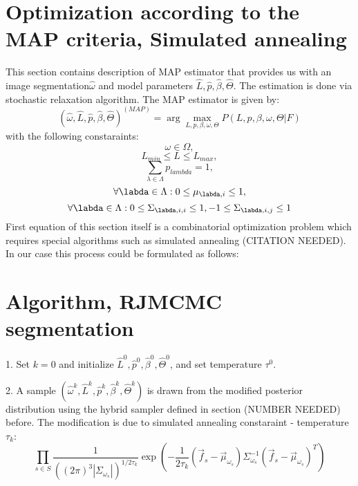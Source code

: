 \documentclass[journal]{IEEEtran}
\begin{document}
{\section{Optimization according to the MAP criteria, Simulated annealing}
This section contains description of MAP estimator that provides us with an image segmentation$\widehat{\omega}$ and model parameters $\widehat{L},\widehat{p},\widehat{\beta},\widehat{\Theta}$. The estimation is done via stochastic relaxation algorithm. The MAP estimator is given by:
\begin{equation}
\left(\widehat{\omega},\widehat{L},\widehat{p},\widehat{\beta},\widehat{\Theta}\right)^{\left(MAP\right)} = 
\arg \max\limits_{L,p,\beta,\omega,\Theta}P\left(L,p,\beta,\omega,\Theta\left|\right.F\right) 
\end{equation}
with the following constaraints:
\begin{equation}
\omega \in \Omega,
\end{equation}
\begin{equation}
L_{min} \leq L \leq L_{max},
\end{equation}
\begin{equation}
\sum\limits_{\lambda\in\Lambda}p_{lambda} = 1,
\end{equation}
\begin{equation}
\forall\labda\in\Lambda : 0 \leq \mu_{\labda,i} \leq 1,
\end{equation}
\begin{equation}
\forall\labda\in\Lambda : 0 \leq \Sigma_{\labda,i,i} \leq 1, -1 \leq \Sigma_{\labda,i,j} \leq 1
\end{equation}
First equation of this section itself is a combinatorial optimization problem which requires special algorithms such as simulated annealing (CITATION NEEDED). In our case this process could be formulated as follows:

\section{Algorithm, RJMCMC segmentation}

1. Set $k=0$ and initialize $\widehat{L}^{0},\widehat{p}^{0},\widehat{\beta}^{0},\widehat{\Theta}^{0}$, and set temperature $\tau^{0}$.

2. A sample $\left(\widehat{\omega}^{k},\widehat{L}^{k},\widehat{p}^{k},\widehat{\beta}^{k},\widehat{\Theta}^{k}\right)$ is drawn from the modified posterior distribution using the hybrid sampler defined in section (NUMBER NEEDED) before. The modification is due to simulated annealing constaraint - temperature $\tau_{k}$:
\begin{equation}
\prod\limits_{s\in S}
\frac{1}
{\left(\left(2\pi\right)^{3}
\left|\Sigma_{\omega_{s}}\right|\right)^{1/2\tau_{k}}
}
\exp{
\left(
-\frac{1}{2\tau_{k}}
\left(\vec{f}_{s}-\vec{\mu}_{\omega_{s}}\right)
\Sigma_{\omega_{s}}^{-1}\left(\vec{f}_{s}-\vec{\mu}_{\omega_{s}}\right)^{T}
\right)

}
\end{equation}}
\end{document}
